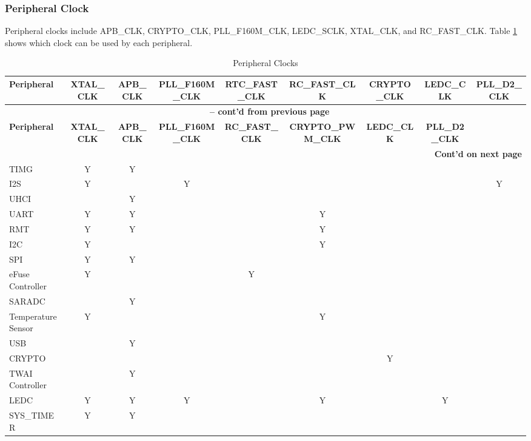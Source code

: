 \documentclass[main\_\_EN.tex]{subfiles}
\begin{document}
\subsubsection{Peripheral Clock}
Peripheral clocks include APB\_CLK, CRYPTO\_CLK, PLL\_F160M\_CLK, LEDC\_SCLK, XTAL\_CLK, and RC\_FAST\_CLK. Table \ref{tab:resclk-periph-clks} shows which clock can be used by each peripheral.

\begin{landscape}
\begin{longtable}[c]{|p{2.5cm}|c|c|c|c|c|c|c|c| }
 \caption{Peripheral Clocks}
    \label{tab:resclk-periph-clks} \\
  \hline
        \rowcolor{lightgray}
        \textbf{Peripheral} &  \textbf{XTAL\_CLK} &  \textbf{APB\_CLK} &  \textbf{PLL\_F160M\_CLK} &  \textbf{RTC\_FAST\_CLK} &  \textbf{RC\_FAST\_CLK} &  \textbf{CRYPTO\_CLK} &   \textbf{LEDC\_CLK} &  \textbf{PLL\_D2\_CLK}  \\\hline
        \endfirsthead

       \multicolumn{9}{c}{\bfseries \tablename\ \thetable{} -- cont'd from previous page}\\\hline
       \rowcolor{lightgray}
        \textbf{Peripheral} &  \textbf{XTAL\_CLK} &  \textbf{APB\_CLK} &  \textbf{PLL\_F160M\_CLK} & \textbf{RC\_FAST\_CLK} &  \textbf{CRYPTO\_PWM\_CLK} &   \textbf{LEDC\_CLK} & \textbf{PLL\_D2\_CLK}  \\\hline
        \endhead

    \multicolumn{9}{r}{\textbf{Cont'd on next page}} \\
    \endfoot
    \endlastfoot
    \hline
        TIMG & Y & Y &   &   &   & & &\\
        \hline
        I2S  & Y &   & Y &  &   & & & Y\\
        \hline
        UHCI &  & Y   &   &   &   & & &\\
        \hline
        UART & Y & Y   &   &   & Y & & &\\
        \hline
        RMT  & Y & Y   &   &   & Y & & &\\
        \hline
        I2C  & Y &   &   &   & Y & & &\\
        \hline
        SPI  & Y & Y   &   &   &   & & &\\
        \hline
        eFuse Controller &  Y &   & & Y & & & &\\
        \hline
        SARADC &   & Y    &   &   &   & & &\\
        \hline
        Temperature Sensor &  Y &     &   &   &  Y & & & \\
        \hline
        USB &   & Y    &   &   &   & & & \\
        \hline
        CRYPTO  &   &      &   &   &   &Y & &\\
        \hline
        TWAI Controller &  & Y   &  & & & & &\\
        \hline
        LEDC & Y&  Y   &Y &   &  Y & & Y &\\
        \hline
        SYS\_TIMER& Y & Y   &   &   &   & & &\\
        \hline
\end{longtable}
\end{landscape}
\end{document}
